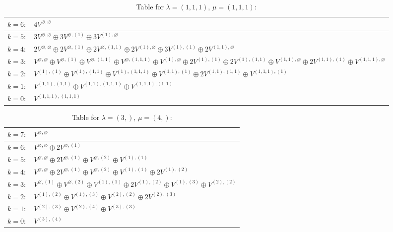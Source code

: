 \documentclass[a4paper,12pt]{article}
\begin{document}
\renewcommand{\arraystretch}{1.6} 
\begin{table}[H]
\centering
\caption{Table for $\lambda = (1, 1, 1)$, $\mu = (1, 1, 1)$:}
\begin{tabular}{|>{\centering\arraybackslash}p{15cm}|}
\hline
 $k = 6: \quad 4 V^{\varnothing, \varnothing} $ \\ \hline
 $k = 5: \quad 3 V^{\varnothing, \varnothing} \oplus 3 V^{\varnothing, (1)} \oplus 3 V^{(1), \varnothing} $ \\ \hline
 $k = 4: \quad 2 V^{\varnothing, \varnothing} \oplus 2 V^{\varnothing, (1)} \oplus 2 V^{\varnothing, (1, 1)} \oplus 2 V^{(1), \varnothing} \oplus 3 V^{(1), (1)} \oplus 2 V^{(1, 1), \varnothing} $ \\ \hline
 $k = 3: \quad V^{\varnothing, \varnothing} \oplus V^{\varnothing, (1)} \oplus V^{\varnothing, (1, 1)} \oplus V^{\varnothing, (1, 1, 1)} \oplus V^{(1), \varnothing} \oplus 2 V^{(1), (1)} \oplus 2 V^{(1), (1, 1)} \oplus V^{(1, 1), \varnothing} \oplus 2 V^{(1, 1), (1)} \oplus V^{(1, 1, 1), \varnothing} $ \\ \hline
 $k = 2: \quad V^{(1), (1)} \oplus V^{(1), (1, 1)} \oplus V^{(1), (1, 1, 1)} \oplus V^{(1, 1), (1)} \oplus 2 V^{(1, 1), (1, 1)} \oplus V^{(1, 1, 1), (1)} $ \\ \hline
 $k = 1: \quad V^{(1, 1), (1, 1)} \oplus V^{(1, 1), (1, 1, 1)} \oplus V^{(1, 1, 1), (1, 1)} $ \\ \hline
 $k = 0: \quad V^{(1, 1, 1), (1, 1, 1)} $ \\ \hline
\end{tabular}
\end{table}

\renewcommand{\arraystretch}{1.6} 
\begin{table}[H]
\centering
\caption{Table for $\lambda = (3,)$, $\mu = (4,)$:}
\begin{tabular}{|>{\centering\arraybackslash}p{15cm}|}
\hline
 $k = 7: \quad V^{\varnothing, \varnothing} $ \\ \hline
 $k = 6: \quad V^{\varnothing, \varnothing} \oplus 2 V^{\varnothing, (1)} $ \\ \hline
 $k = 5: \quad V^{\varnothing, \varnothing} \oplus 2 V^{\varnothing, (1)} \oplus V^{\varnothing, (2)} \oplus V^{(1), (1)} $ \\ \hline
 $k = 4: \quad V^{\varnothing, \varnothing} \oplus 2 V^{\varnothing, (1)} \oplus V^{\varnothing, (2)} \oplus V^{(1), (1)} \oplus 2 V^{(1), (2)} $ \\ \hline
 $k = 3: \quad V^{\varnothing, (1)} \oplus V^{\varnothing, (2)} \oplus V^{(1), (1)} \oplus 2 V^{(1), (2)} \oplus V^{(1), (3)} \oplus V^{(2), (2)} $ \\ \hline
 $k = 2: \quad V^{(1), (2)} \oplus V^{(1), (3)} \oplus V^{(2), (2)} \oplus 2 V^{(2), (3)} $ \\ \hline
 $k = 1: \quad V^{(2), (3)} \oplus V^{(2), (4)} \oplus V^{(3), (3)} $ \\ \hline
 $k = 0: \quad V^{(3), (4)} $ \\ \hline
\end{tabular}
\end{table}
\end{document}

